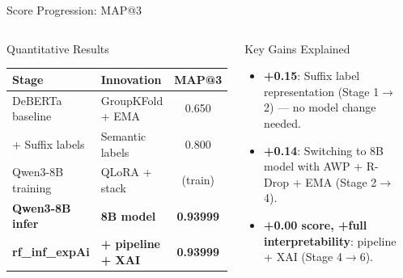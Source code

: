 \documentclass[aspectratio=169]{beamer}
\begin{document}
\begin{frame}{Score Progression: MAP@3}
\begin{columns}[T]
\begin{block}{Quantitative Results}
\setlength{\tabcolsep}{5pt}
\renewcommand{\arraystretch}{1.4}
\begin{tabular}{llc}
\toprule
\textbf{Stage} & \textbf{Innovation} & \textbf{MAP@3}\\
\midrule
\rowcolor{RowTintA}
DeBERTa baseline & GroupKFold + EMA & 0.650\\
\rowcolor{RowTintB}
+ Suffix labels & Semantic labels & 0.800\\
\rowcolor{RowTintA}
\textcolor{SoftGray}{Qwen3-8B training} & \textcolor{SoftGray}{QLoRA + stack} & \textcolor{SoftGray}{(train)}\\
\rowcolor{LightGreen}
\textbf{Qwen3-8B infer} & \textbf{8B model} & \textbf{0.93999}\\
\rowcolor{LightGreen}
\textbf{rf\_inf\_expAi} & \textbf{+ pipeline + XAI} & \textbf{0.93999}\\
\bottomrule
\end{tabular}
\end{block}
\vspace{8pt}
\begin{block}{Key Gains Explained}
\begin{itemize}
  \item \textbf{+0.15}: Suffix label representation (Stage 1$\to$2) --- no model change needed.
  \item \textbf{+0.14}: Switching to 8B model with AWP + R-Drop + EMA (Stage 2$\to$4).
  \item \textbf{+0.00 score, +full interpretability}: pipeline + XAI (Stage 4$\to$6).
\end{itemize}
\end{block}
\begin{center}
\vspace{6pt}
\end{center}
\end{columns}
\end{frame}
\end{document}
